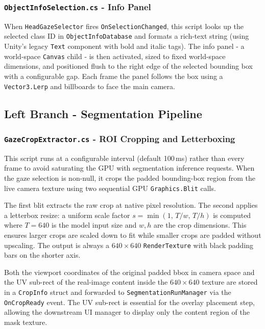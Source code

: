 \documentclass{article}
\begin{document}
\subsubsection{\texttt{ObjectInfoSelection.cs} - Info Panel}

When \texttt{HeadGazeSelector} fires \texttt{OnSelectionChanged}, this script looks up the selected class ID in \texttt{ObjectInfoDatabase} and formats a rich-text string (using Unity's legacy \texttt{Text} component with bold and italic tags). The info panel - a world-space \texttt{Canvas} child - is then activated, sized to fixed world-space dimensions, and positioned flush to the right edge of the selected bounding box with a configurable gap. Each frame the panel follows the box using a \texttt{Vector3.Lerp} and billboards to face the main camera.

\subsection{Left Branch - Segmentation Pipeline}

\subsubsection{\texttt{GazeCropExtractor.cs} - ROI Cropping and Letterboxing}

This script runs at a configurable interval (default 100\,ms) rather than every frame to avoid saturating the GPU with segmentation inference requests. When the gaze selection is non-null, it crops the padded bounding-box region from the live camera texture using two sequential GPU \texttt{Graphics.Blit} calls.

The first blit extracts the raw crop at native pixel resolution. The second applies a letterbox resize: a uniform scale factor $s = \min(1,\, T/w,\, T/h)$ is computed where $T = 640$ is the model input size and $w, h$ are the crop dimensions. This ensures larger crops are scaled down to fit while smaller crops are padded without upscaling. The output is always a $640 \times 640$ \texttt{RenderTexture} with black padding bars on the shorter axis.

Both the viewport coordinates of the original padded bbox in camera space and the UV sub-rect of the real-image content inside the $640 \times 640$ texture are stored in a \texttt{CropInfo} struct and forwarded to \texttt{SegmentationRunManager} via the \texttt{OnCropReady} event. The UV sub-rect is essential for the overlay placement step, allowing the downstream UI manager to display only the content region of the mask texture.
\end{document}
